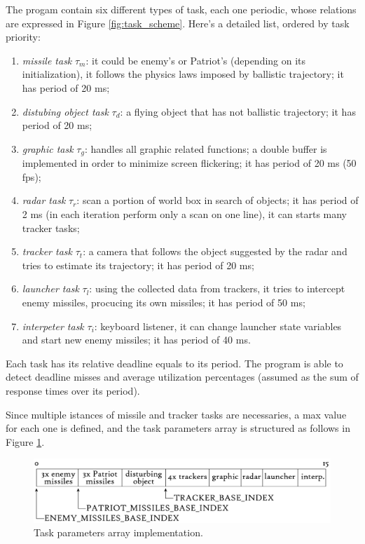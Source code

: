 \documentclass[notitlepage,a4paper,11pt]{article} %
\begin{document}
		The progam contain six different types of task, each one periodic, whose relations are expressed in Figure \ref{fig:task_scheme}. Here's a detailed list, ordered by task priority:
		\begin{enumerate}
			\item \emph{missile task} $\tau_m$: it could be enemy's or Patriot's (depending on its initialization), it follows the physics laws imposed by ballistic trajectory; it has period of 20 ms;
			\item \emph{distubing object task} $\tau_d$: a flying object that has not ballistic trajectory; it has period of 20 ms;
			\item \emph{graphic task} $\tau_g$: handles all graphic related functions; a double buffer is implemented in order to minimize screen flickering; it has period of 20 ms (50 fps);
			\item \emph{radar task} $\tau_r$: scan a portion of world box in search of objects; it has period of 2 ms (in each iteration perform only a scan on one line), it can starts many tracker tasks;
			\item \emph{tracker task} $\tau_t$: a camera that follows the object suggested by the radar and tries to estimate its trajectory; it has period of 20 ms;
			\item \emph{launcher task} $\tau_l$: using the collected data from trackers, it tries to intercept enemy missiles, procucing its own missiles; it has period of 50 ms;
			\item \emph{interpeter task} $\tau_i$: keyboard listener, it can change launcher state variables and start new enemy missiles; it has period of 40 ms.
		\end{enumerate}
		Each task has its relative deadline equals to its period. The program is able to detect deadline misses and average utilization percentages (assumed as the sum of response times over its period).

		Since multiple istances of missile and tracker tasks are necessaries, a max value for each one is defined, and the task parameters array is structured as follows in Figure \ref{fig:task_param}.

		\begin{figure}[hb]
			\includegraphics[width=\textwidth]{task_param}
			\caption{Task parameters array implementation.}
			\label{fig:task_param}
		\end{figure}
\end{document}
